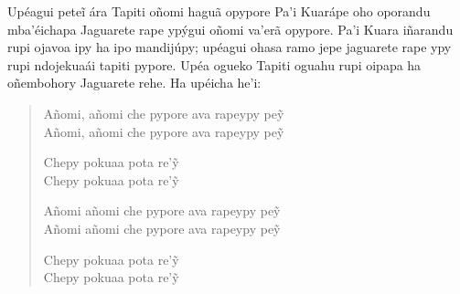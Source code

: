 Upéagui peteĩ ára Tapiti oñomi haguã opypore Pa'i Kuarápe oho oporandu
mba'éichapa Jaguarete rape ypýgui oñomi va'erã opypore. Pa'i Kuara
iñarandu rupi ojavoa ipy ha ipo mandijúpy; upéagui ohasa ramo jepe
jaguarete rape ypy rupi ndojekuaái tapiti pypore. Upéa ogueko Tapiti
oguahu rupi oipapa ha oñembohory Jaguarete rehe. Ha upéicha he'i:

\begin{verse}
Añomi, añomi che pypore ava rapeypy peỹ\\
Añomi, añomi che pypore ava rapeypy peỹ

Chepy pokuaa pota re'ỹ\\
Chepy pokuaa pota re'ỹ

Añomi añomi che pypore ava rapeypy peỹ\\
Añomi añomi che pypore ava rapeypy peỹ

Chepy pokuaa pota re'ỹ\\
Chepy pokuaa pota re'ỹ
\end{verse}




